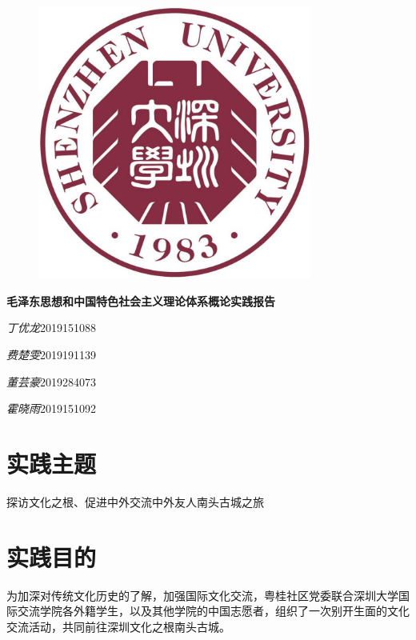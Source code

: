 \documentclass[UTF8]{ctexart}
\begin{document}
\fancyhf{}
\begin{titlepage}
    \vspace*{\fill}
    \begin{figure}[h]
        \centering
        \includegraphics[width=9cm]{imgs/logo.jpg}
    \end{figure}
    \vskip 15mm
    \begin{center}
        \normalfont
        {\Large\bfseries 毛泽东思想和中国特色社会主义理论体系概论实践报告}
        
        \vskip 5mm

        \vskip 30mm
        {\Large\itshape 丁优龙}{\Large 2019151088}

        \medskip
        {\Large\itshape 费楚雯}{\Large 2019191139}
        
        \medskip
        {\Large\itshape 董芸豪}{\Large 2019284073}
        
        \medskip
        {\Large\itshape 霍晓雨}{\Large 2019151092}
    \end{center}
\end{titlepage}
\clearpage
\section*{\Large 实践主题}
探访文化之根、促进中外交流\raisebox{0.5mm}{------}中外友人南头古城之旅
\section*{\Large 实践目的}
为加深对传统文化历史的了解，加强国际文化交流，粤桂社区党委联合深圳大学国际交流学院各外籍学生，以及其他学院的中国志愿者，组织了一次别开生面的文化交流活动，共同前往深圳文化之根南头古城。
\end{document}
